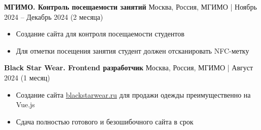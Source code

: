 \textbf{МГИМО. Контроль посещаемости занятий} \hfill Москва, Россия, МГИМО | Ноябрь 2024 – Декабрь 2024 (2 месяца)
\begin{itemize}[noitemsep, topsep=0pt, partopsep=0pt, parsep=0pt]
    \item Создание сайта для контроля посещаемости студентов
    \item Для отметки посещения занятия студент должен отсканировать NFC-метку
\end{itemize}

\textbf{Black Star Wear. Frontend разработчик} \hfill Москва, Россия, МГИМО | Август 2024 (1 месяц)
\begin{itemize}[noitemsep, topsep=0pt, partopsep=0pt, parsep=0pt]
    \item Создание сайта \href{https://blackstarwear.ru}{blackstarwear.ru} для продажи одежды преимущественно на Vue.js
    \item Сдача полностью готового и безошибочного сайта в срок
\end{itemize}

